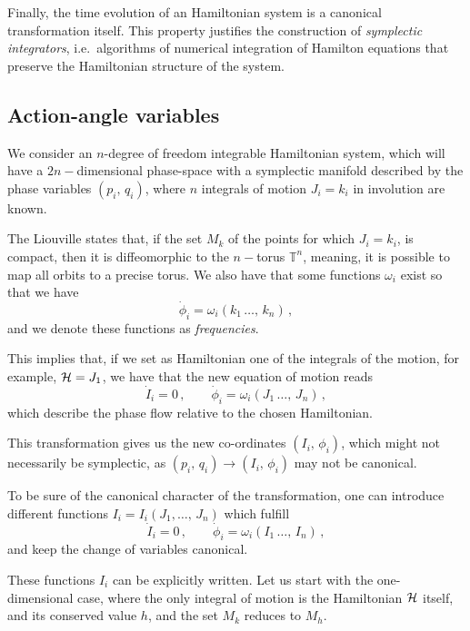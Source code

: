 Finally, the time evolution of an Hamiltonian system is a canonical transformation itself. This property justifies the construction of \textit{symplectic integrators}, i.e.\ algorithms of numerical integration of Hamilton equations that preserve the Hamiltonian structure of the system.


\subsection{Action-angle variables}

We consider an $n$-degree of freedom integrable Hamiltonian system, which will have a $2n-$dimensional phase-space with a symplectic manifold described by the phase variables $(p_i,\,q_i)$, where $n$ integrals of motion $J_i=k_i$ in involution are known.

The Liouville states that, if the set $M_{k}$ of the points for which $J_i=k_i$, is compact, then it is diffeomorphic to the $n-$torus $\mathbb{T}^n$, meaning, it is possible to map all orbits to a precise torus. We also have that some functions $\omega_i$ exist so that we have
\begin{equation}
    \dot{\phi}_i = \omega_i(k_1\,\dots,\,k_n)\,, 
\end{equation}
and we denote these functions as \textit{frequencies}.

This implies that, if we set as Hamiltonian one of the integrals of the motion, for example, $\mathcal{H}=J_1$, we have that the new equation of motion reads
\begin{equation} 
    \dot I_i = 0\,, \qquad \dot \phi_i = \omega_i(J_1\,\dots,\,J_n) \,,
\end{equation} 
which describe the phase flow relative to the chosen Hamiltonian.

This transformation gives us the new co-ordinates $(I_i,\,\phi_i)$, which might not necessarily be symplectic, as $(p_i,\,q_i)\to(I_i,\,\phi_i)$ may not be canonical.

To be sure of the canonical character of the transformation, one can introduce different functions $I_i = I_i(J_1,\dots,\,J_n)$ which fulfill
%
\begin{equation}
    \dot I_i = 0\,, \qquad \dot \phi_i = \omega_i(I_1\,\dots,\,I_n)\,,
\end{equation} 
%
and keep the change of variables canonical.

These functions $I_i$ can be explicitly written. Let us start with the one-di\-men\-sio\-nal case, where the only integral of motion is the Hamiltonian $\mathcal{H}$ itself, and its conserved value $h$, and the set $M_k$ reduces to $M_h$.

